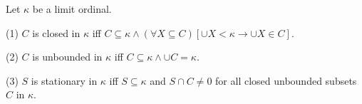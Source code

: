 Let $\kappa$ be a limit ordinal.

(1) $C$ is closed in $\kappa$ iff $C \subseteq \kappa \wedge (\forall X \subseteq C)[\cup X < \kappa \rightarrow \cup X \in C]$.

(2) $C$ is unbounded in $\kappa$ iff $C \subseteq \kappa \wedge \cup C = \kappa$.

(3) $S$ is stationary in $\kappa$ iff $S \subseteq \kappa$ and $S \cap C \neq 0$ for all closed unbounded subsets $C$ in $\kappa$.
